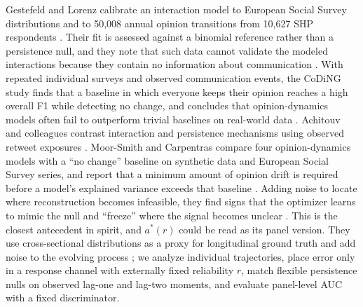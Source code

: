 
Gestefeld and Lorenz calibrate an interaction model to European Social Survey distributions and to 50,008 annual opinion transitions from 10,627 SHP respondents \cite{gestefeld2023}.
Their fit is assessed against a binomial reference rather than a persistence null, and they note that such data cannot validate the modeled interactions because they contain no information about communication \cite{gestefeld2023}.
With repeated individual surveys and observed communication events, the CoDiNG study finds that a baseline in which everyone keeps their opinion reaches a high overall F1 while detecting no change, and concludes that opinion-dynamics models often fail to outperform trivial baselines on real-world data \cite{coding2024}.
Achitouv and colleagues contrast interaction and persistence mechanisms using observed retweet exposures \cite{achitouv2026}.
Moor-Smith and Carpentras compare four opinion-dynamics models with a ``no change'' baseline on synthetic data and European Social Survey series, and report that a minimum amount of opinion drift is required before a model's explained variance exceeds that baseline \cite{moor2026}.
Adding noise to locate where reconstruction becomes infeasible, they find signs that the optimizer learns to mimic the null and ``freeze'' where the signal becomes unclear \cite{moor2026}.
This is the closest antecedent in spirit, and $a^*(r)$ could be read as its panel version.
They use cross-sectional distributions as a proxy for longitudinal ground truth and add noise to the evolving process \cite{moor2026}; we analyze individual trajectories, place error only in a response channel with externally fixed reliability $r$, match flexible persistence nulls on observed lag-one and lag-two moments, and evaluate panel-level AUC with a fixed discriminator.

